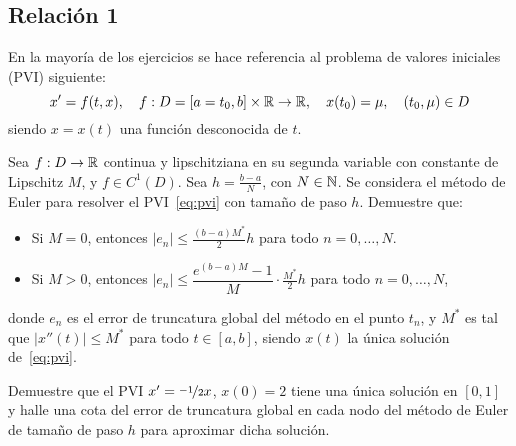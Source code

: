 \subsection{Relación 1}
\setcounter{ejercicio}{0}

En la mayoría de los ejercicios se hace referencia al problema de valores iniciales (PVI) siguiente:
\begin{equation}\label{eq:pvi}
    x' = f(t, x),\quad f : D = [a = t_0, b] \times \mathbb{R} \to \mathbb{R},\quad x(t_0) = \mu,\quad (t_0, \mu) \in D
\end{equation}
siendo $x = x(t)$ una función desconocida de $t$.

\begin{ejercicio}\label{ej:3.1.1}
    Sea $f : D \to \mathbb{R}$ continua y lipschitziana en su segunda variable con constante de Lipschitz $M$, y $f\in C^1(D)$. Sea $h = \frac{b-a}{N}$, con $N \in \mathbb{N}$. Se considera el método de Euler para resolver el PVI~\eqref{eq:pvi} con tamaño de paso $h$. Demuestre que:
    \begin{itemize}
        \item Si $M = 0$, entonces $|e_n| \leq \frac{(b-a)M^*}{2} h$ para todo $n = 0, \ldots, N$.
        \item Si $M > 0$, entonces $|e_n| \leq \dfrac{e^{(b-a)M} - 1}{M} \cdot \frac{M^*}{2} h$ para todo $n = 0, \ldots, N$,
    \end{itemize}
    donde $e_n$ es el error de truncatura global del método en el punto $t_n$, y $M^*$ es tal que $|x''(t)| \leq M^*$ para todo $t \in [a, b]$, siendo $x(t)$ la única solución de~\eqref{eq:pvi}.    
\end{ejercicio}


\begin{ejercicio}\label{ej:3.1.2}
    Demuestre que el PVI $x' = \nicefrac{-1}{2} x$, $x(0) = 2$ tiene una única solución en $[0, 1]$ y halle una cota del error de truncatura global en cada nodo del método de Euler de tamaño de paso $h$ para aproximar dicha solución.
\end{ejercicio}


